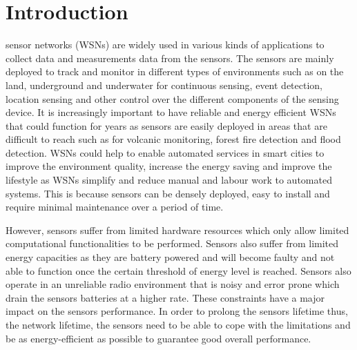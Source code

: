 \section{Introduction}

% 
% 
% 
% 

 sensor networks (WSNs) are widely used in various kinds of applications to collect data and measurements data from the sensors. The sensors are mainly deployed to track and monitor in different types of environments such as on the land, underground and underwater for continuous sensing, event detection, location sensing and other control over the different components of the sensing device. It is increasingly important to have reliable and energy efficient WSNs that could function for years as sensors are easily deployed in areas that are difficult to reach such as for volcanic monitoring, forest fire detection and flood detection. WSNs could help to enable automated services in smart cities to improve the environment quality, increase the energy saving and improve the lifestyle as WSNs simplify and reduce manual and labour work to automated systems. This is because sensors can be densely deployed, easy to install and require minimal maintenance over a period of time. 

However, sensors suffer from limited hardware resources which only allow limited computational functionalities to be performed. Sensors also suffer from limited energy capacities as they are battery powered and will become faulty and not able to function once the certain threshold of energy level is reached. 
Sensors also operate in an unreliable radio environment that is noisy and error prone which drain the sensors batteries at a higher rate. These constraints have a major impact on the sensors performance. In order to prolong the sensors lifetime thus, the network lifetime, the sensors need to be able to cope with the limitations and be as energy-efficient as possible to guarantee good overall performance.

